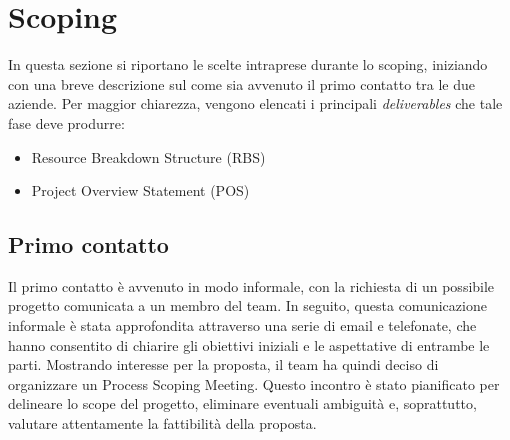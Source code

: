 \documentclass[a4paper,12pt, openright]{report}
\begin{document}
\chapter{Scoping}
In questa sezione si riportano le scelte intraprese durante lo scoping, iniziando con una breve descrizione sul come sia avvenuto il primo contatto tra le due aziende. Per maggior chiarezza, vengono elencati i principali \textit{deliverables} che tale fase deve produrre:
\begin{itemize}
    \item Resource Breakdown Structure (RBS)
    \item Project Overview Statement (POS)
\end{itemize}

\section{Primo contatto}
Il primo contatto è avvenuto in modo informale, con la richiesta di un possibile progetto comunicata a un membro del team. In seguito, questa comunicazione informale è stata approfondita attraverso una serie di email e telefonate, che hanno consentito di chiarire gli obiettivi iniziali e le aspettative di entrambe le parti. Mostrando interesse per la proposta, il team ha quindi deciso di organizzare un Process Scoping Meeting. Questo incontro è stato pianificato per delineare lo scope del progetto, eliminare eventuali ambiguità e, soprattutto, valutare attentamente la fattibilità della proposta.
\end{document}
